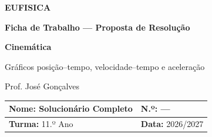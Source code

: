 \documentclass[11pt,a4paper]{article}
\begin{document}
	
	
	\begin{center}
		
		{\Huge\bfseries\textcolor{eufblue}{EUFISICA}}
		
		\vspace{1mm}
		
		{\Large\bfseries Ficha de Trabalho --- Proposta de Resolução}
		
		\vspace{1mm}
		
		{\LARGE\bfseries Cinemática}
		
		\vspace{1mm}
		
		{\large
			Gráficos posição--tempo, velocidade--tempo e aceleração
		}
		
		\vspace{2mm}
		
		{\small Prof. José Gonçalves}
		
	\end{center}
	
	\vspace{2mm}
	
	\begin{tabularx}{\textwidth}{|X|X|}
		\hline
		\textbf{Nome:} Solucionário Completo & \textbf{N.º:} --- \\[0.15cm]
		\hline
		\textbf{Turma:} 11.º Ano & \textbf{Data:} 2026/2027 \\[0.15cm]
		\hline
	\end{tabularx}
	
	\vspace{4mm}
	
	
\end{document}
